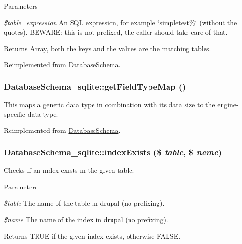 \begin{DoxyParams}{Parameters}
\item[{\em \$table\_\-expression}]An SQL expression, for example \char`\"{}simpletest\%\char`\"{} (without the quotes). BEWARE: this is not prefixed, the caller should take care of that.\end{DoxyParams}
\begin{DoxyReturn}{Returns}
Array, both the keys and the values are the matching tables. 
\end{DoxyReturn}


Reimplemented from \hyperlink{classDatabaseSchema_aecbf376fb9d85811278ee6448e99feca}{DatabaseSchema}.\hypertarget{classDatabaseSchema__sqlite_a0acdc6880132e45933c71928ca9d0ea7}{
\subsubsection[{getFieldTypeMap}]{\setlength{\rightskip}{0pt plus 5cm}DatabaseSchema\_\-sqlite::getFieldTypeMap ()}}
\label{classDatabaseSchema__sqlite_a0acdc6880132e45933c71928ca9d0ea7}
This maps a generic data type in combination with its data size to the engine-\/specific data type. 

Reimplemented from \hyperlink{classDatabaseSchema_a82022c76c3131c4d745736d08321b788}{DatabaseSchema}.\hypertarget{classDatabaseSchema__sqlite_ac3f44b37b0b2d08a47433b5b4120aa6b}{
\subsubsection[{indexExists}]{\setlength{\rightskip}{0pt plus 5cm}DatabaseSchema\_\-sqlite::indexExists (\$ {\em table}, \/  \$ {\em name})}}
\label{classDatabaseSchema__sqlite_ac3f44b37b0b2d08a47433b5b4120aa6b}
Checks if an index exists in the given table.


\begin{DoxyParams}{Parameters}
\item[{\em \$table}]The name of the table in drupal (no prefixing). \item[{\em \$name}]The name of the index in drupal (no prefixing).\end{DoxyParams}
\begin{DoxyReturn}{Returns}
TRUE if the given index exists, otherwise FALSE. 
\end{DoxyReturn}


